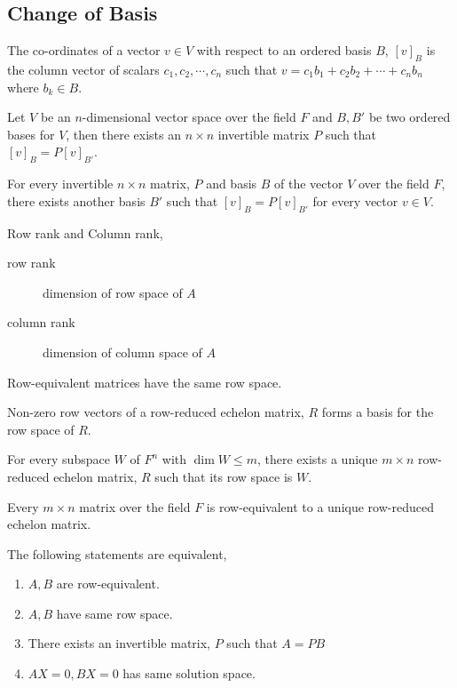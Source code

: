 \subsection{Change of Basis}
	\begin{definition}
		The co-ordinates of a vector $v \in V$ with respect to an ordered basis $B$, $[v]_B$ is the column vector of scalars $c_1, c_2, \cdots, c_n$ such that $v = c_1b_1 + c_2b_2 + \cdots + c_nb_n$ where $b_k \in B$. 
	\end{definition}
	\begin{theorem}
		Let $V$ be an $n$-dimensional vector space over the field $F$ and $B,B'$ be two ordered bases for $V$, then there exists an $n \times n$ invertible matrix $P$ such that $[v]_B = P[v]_{B'}$.
	\end{theorem}
	\begin{theorem}
		For every invertible $n \times n$ matrix, $P$ and basis $B$ of the vector $V$ over the field $F$, there exists another basis $B'$ such that $[v]_B = P[v]_{B'}$ for every vector $v \in V$.
	\end{theorem}
	\begin{definition}
		Row rank and Column rank,
		\begin{description}
			\item[row rank] dimension of row space of $A$
			\item[column rank] dimension of column space of $A$
		\end{description}
	\end{definition}
	\begin{theorem}
		Row-equivalent matrices have the same row space.
	\end{theorem}
	\begin{theorem}
		Non-zero row vectors of a row-reduced echelon matrix, $R$ forms a basis for the row space of $R$.
	\end{theorem}
	\begin{theorem}
		For every subspace $W$ of $F^n$ with $\dim W \le m$, there exists a unique $m \times n$ row-reduced echelon matrix, $R$ such that its row space is $W$.
	\end{theorem}
	\begin{theorem}
		Every $m \times n$ matrix over the field $F$ is row-equivalent to a unique row-reduced echelon matrix.
	\end{theorem}
	\begin{theorem}
		The following statements are equivalent,
		\begin{enumerate}
			\item $A,B$ are row-equivalent.
			\item $A,B$ have same row space.
			\item There exists an invertible matrix, $P$ such that $A = PB$
			\item $AX=0, BX=0$ has same solution space.
		\end{enumerate}
	\end{theorem}

